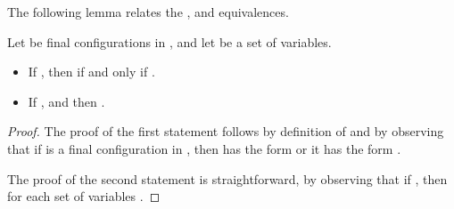 \documentclass{tlp}
\begin{document}
The following lemma relates the , 
and  equivalences.


\begin{lemma}\label{lem:relrel}
Let  be final configurations in ,  and let  be a set of variables.
\begin{itemize}
  \item If ,  then   if and only if .
  \item If ,  and   then .
\end{itemize}
\end{lemma}
\begin{proof}
The proof of the first statement follows by definition of  and by observing that if  is a final configuration in , then 
has the form   or it
has the form .

The proof of the second statement is straightforward, by observing that if , then
 for each set of variables .
\end{proof}
\end{document}
